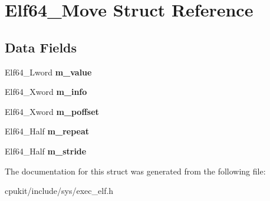 \hypertarget{structElf64__Move}{}\section{Elf64\+\_\+\+Move Struct Reference}
\label{structElf64__Move}
\subsection*{Data Fields}
\begin{DoxyCompactItemize}
\item 
\mbox{\label{structElf64__Move_a9acd76b185ef161bcbd292266d02f2b4}} 
Elf64\+\_\+\+Lword {\bfseries m\+\_\+value}
\item 
\mbox{\label{structElf64__Move_a543c917c40646df01c33537a6d8b86cf}} 
Elf64\+\_\+\+Xword {\bfseries m\+\_\+info}
\item 
\mbox{\label{structElf64__Move_a36fe21def9afee88be6acc62e45fdeba}} 
Elf64\+\_\+\+Xword {\bfseries m\+\_\+poffset}
\item 
\mbox{\label{structElf64__Move_ab6f1c59b8b9789cdd223fa525937dbdb}} 
Elf64\+\_\+\+Half {\bfseries m\+\_\+repeat}
\item 
\mbox{\label{structElf64__Move_ac999afc6aec249cd19ebbef408228c95}} 
Elf64\+\_\+\+Half {\bfseries m\+\_\+stride}
\end{DoxyCompactItemize}


The documentation for this struct was generated from the following file\+:\begin{DoxyCompactItemize}
\item 
cpukit/include/sys/exec\+\_\+elf.\+h\end{DoxyCompactItemize}
